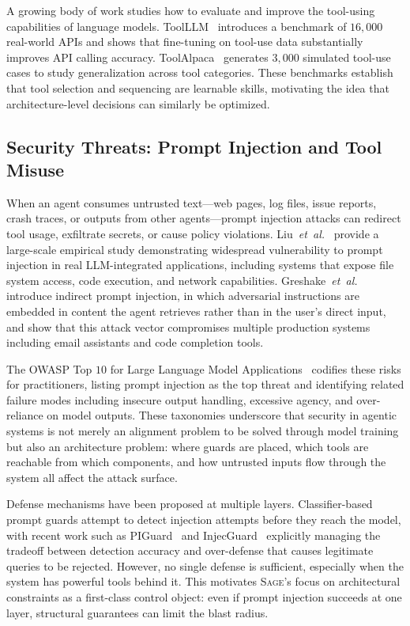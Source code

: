 \documentclass[sigconf,anonymous]{acmart}
\newcommand{\etal}{\emph{et~al.}\xspace}
\newcommand{\SAGE}{\textsc{Sage}\xspace}
\begin{document}
A growing body of work studies how to evaluate and improve the tool-using capabilities of language models. ToolLLM~\cite{qin2023toolllm} introduces a benchmark of $16{,}000$ real-world APIs and shows that fine-tuning on tool-use data substantially improves API calling accuracy. ToolAlpaca~\cite{tang2023toolalpaca} generates $3{,}000$ simulated tool-use cases to study generalization across tool categories. These benchmarks establish that tool selection and sequencing are learnable skills, motivating the idea that architecture-level decisions can similarly be optimized.

\subsection{Security Threats: Prompt Injection and Tool Misuse}

When an agent consumes untrusted text---web pages, log files, issue reports, crash traces, or outputs from other agents---prompt injection attacks can redirect tool usage, exfiltrate secrets, or cause policy violations. Liu~\etal~\cite{liu2024promptinjection} provide a large-scale empirical study demonstrating widespread vulnerability to prompt injection in real LLM-integrated applications, including systems that expose file system access, code execution, and network capabilities. Greshake~\etal~\cite{greshake2023indirect} introduce indirect prompt injection, in which adversarial instructions are embedded in content the agent retrieves rather than in the user's direct input, and show that this attack vector compromises multiple production systems including email assistants and code completion tools.

The OWASP Top $10$ for Large Language Model Applications~\cite{owasp2023llmtop10} codifies these risks for practitioners, listing prompt injection as the top threat and identifying related failure modes including insecure output handling, excessive agency, and over-reliance on model outputs. These taxonomies underscore that security in agentic systems is not merely an alignment problem to be solved through model training but also an architecture problem: where guards are placed, which tools are reachable from which components, and how untrusted inputs flow through the system all affect the attack surface.

Defense mechanisms have been proposed at multiple layers. Classifier-based prompt guards attempt to detect injection attempts before they reach the model, with recent work such as PIGuard~\cite{li2024piguard} and InjecGuard~\cite{injecguard2024} explicitly managing the tradeoff between detection accuracy and over-defense that causes legitimate queries to be rejected. However, no single defense is sufficient, especially when the system has powerful tools behind it. This motivates \SAGE's focus on architectural constraints as a first-class control object: even if prompt injection succeeds at one layer, structural guarantees can limit the blast radius.
\end{document}

